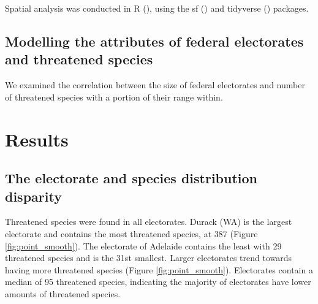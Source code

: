 \documentclass[a4paper,11pt]{article}
\begin{document}
Spatial analysis was conducted in R (\cite{rcoreteamLanguageEnvironmentStatistical2021}), using the sf (\cite{pebesmaSimpleFeaturesStandardized2018}) and tidyverse (\cite{wickhamWelcomeTidyverse2019}) packages. 

\subsection{Modelling the attributes of federal electorates and threatened species}

We examined the correlation between the size of federal electorates and number of threatened species with a portion of their range within.

\section{Results}



\subsection{The electorate and species distribution disparity} 



Threatened species were found in all electorates. Durack (WA) is the largest electorate and contains the most threatened species, at 387 (Figure \ref{fig:point_smooth}). The electorate of Adelaide contains the least with 29 threatened species and is the 31st smallest. Larger electorates trend towards having more threatened species (Figure \ref{fig:point_smooth}). Electorates contain a median of 95 threatened species, indicating the majority of electorates have lower amounts of threatened species.
\end{document}
